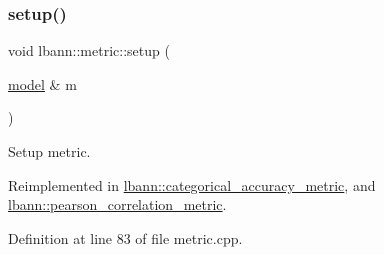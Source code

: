 \subsubsection{\texorpdfstring{setup()}{setup()}}
{\footnotesize\ttfamily void lbann\+::metric\+::setup (\begin{DoxyParamCaption}\item[{\hyperlink{classlbann_1_1model}{model} \&}]{m }\end{DoxyParamCaption})\hspace{0.3cm}{\ttfamily [virtual]}}

Setup metric. 

Reimplemented in \hyperlink{classlbann_1_1categorical__accuracy__metric_a328a63ccc21c31efd511445f5b060960}{lbann\+::categorical\+\_\+accuracy\+\_\+metric}, and \hyperlink{classlbann_1_1pearson__correlation__metric_a4394c0ebb3cacdcec934e4ae322f9bb6}{lbann\+::pearson\+\_\+correlation\+\_\+metric}.



Definition at line 83 of file metric.\+cpp.


